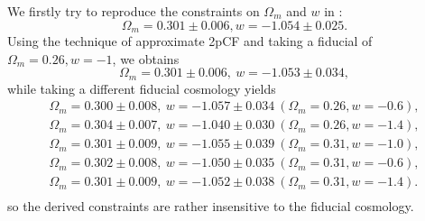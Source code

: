 \documentclass[useAMS,usenatbib]{mnras}
\begin{document}
We firstly try to reproduce the constraints on $\Omega_m$ and $w$ in \citep{Li2016}:
\begin{equation}\label{eq:wcdm_constrain_default}
 \Omega_m=0.301\pm 0.006, w=−1.054\pm 0.025.
\end{equation}
Using the technique of approximate 2pCF and taking a fiducial of $\Omega_m=0.26, w=-1$, we obtains
\begin{equation}
\Omega_m = 0.301 \pm 0.006,\ w=-1.053\pm 0.034,
\end{equation}
while taking a different fiducial cosmology yields
\begin{eqnarray}
\Omega_m = 0.300 \pm 0.008,\ w=-1.057\pm 0.034\ (\Omega_m=0.26, w=-0.6),\\    
\Omega_m = 0.304 \pm 0.007,\ w=-1.040\pm 0.030\ (\Omega_m=0.26, w=-1.4),\\
\Omega_m = 0.301 \pm 0.009,\ w=-1.055\pm 0.039\ (\Omega_m=0.31, w=-1.0),\\
\Omega_m = 0.302 \pm 0.008,\ w=-1.050\pm 0.035\ (\Omega_m=0.31, w=-0.6),\\    
\Omega_m = 0.301 \pm 0.009,\ w=-1.052\pm 0.038\ (\Omega_m=0.31, w=-1.4).\\    
\end{eqnarray}
so the derived constraints are rather insensitive to the fiducial cosmology.
\end{document}
